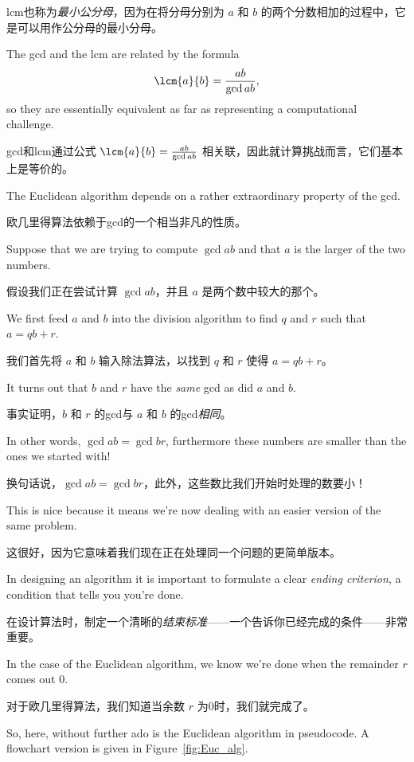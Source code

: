 lcm也称为{\em 最小公分母}，因为在将分母分别为 $a$ 和 $b$ 的两个分数相加的过程中，它是可以用作公分母的最小分母。

The gcd and the lcm are related by the formula 
\[ \lcm{a}{b} = \frac{ab}{\gcd{a}{b}}, \]
so they are essentially equivalent as far as representing a
computational challenge.

gcd和lcm通过公式 $\lcm{a}{b} = \frac{ab}{\gcd{a}{b}}$ 相关联，因此就计算挑战而言，它们基本上是等价的。

The  Euclidean algorithm depends 
on a rather extraordinary property of
the gcd.

欧几里得算法依赖于gcd的一个相当非凡的性质。

Suppose that we are trying to compute $\gcd{a}{b}$ and that
$a$ is the larger of the two numbers.

假设我们正在尝试计算 $\gcd{a}{b}$，并且 $a$ 是两个数中较大的那个。

We first feed $a$ and $b$ into
the division algorithm to find $q$ and $r$ such that $a = qb +r $.

我们首先将 $a$ 和 $b$ 输入除法算法，以找到 $q$ 和 $r$ 使得 $a = qb +r$。

It
turns out that $b$ and $r$ have the {\em same} gcd as did $a$ and
$b$.

事实证明，$b$ 和 $r$ 的gcd与 $a$ 和 $b$ 的gcd{\em 相同}。

In other words, $\gcd{a}{b} = \gcd{b}{r}$, furthermore these
numbers are smaller than the ones we started with!

换句话说，$\gcd{a}{b} = \gcd{b}{r}$，此外，这些数比我们开始时处理的数要小！

This is nice
because it means we're now dealing with an easier version of the same
problem.

这很好，因为它意味着我们现在正在处理同一个问题的更简单版本。

In designing an algorithm it is important to formulate a
clear {\em ending criterion}, a condition that tells you you're done.

在设计算法时，制定一个清晰的{\em 结束标准}——一个告诉你已经完成的条件——非常重要。

In the case of the Euclidean algorithm, we know we're done when the
remainder $r$ comes out $0$.

对于欧几里得算法，我们知道当余数 $r$ 为0时，我们就完成了。

So, here, without further ado is the Euclidean algorithm in
pseudocode.  A flowchart version is given in Figure~\ref{fig:Euc_alg}.

